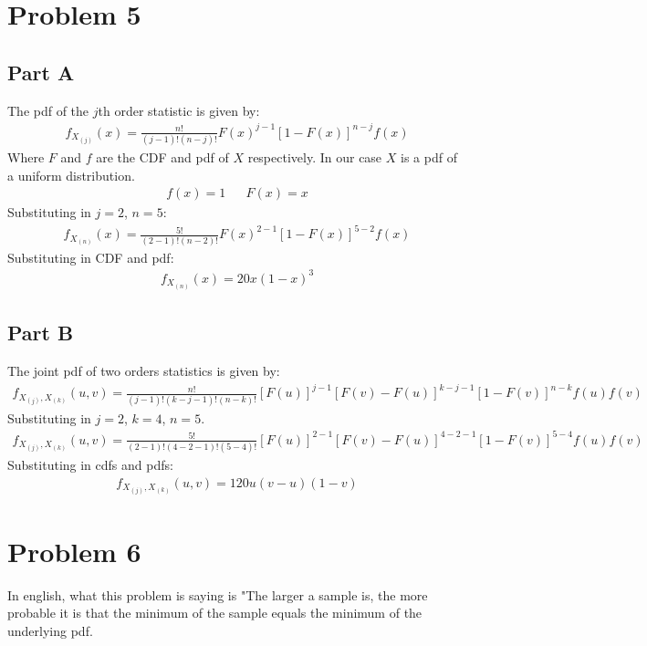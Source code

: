 \documentclass{article}
\begin{document}
\clearpage
\section*{Problem 5}
\subsection*{Part A}
The pdf of the $j$th order statistic is given by:
\begin{align*}
f_{X_{(j)}}(x) = \frac{n!}{(j-1)! (n-j)!} F(x)^{j-1} [1-F(x)]^{n-j} f(x)
\end{align*}
Where $F$ and $f$ are the CDF and pdf of $X$ respectively. In our case $X$ is a pdf of a uniform distribution.
\begin{align*}
f(x) = 1 && F(x) = x
\end{align*}
Substituting in $j=2$, $n=5$:
\begin{align*}
f_{X_{(n)}}(x) = \frac{5!}{(2-1)! (n-2)!} F(x)^{2-1} [1-F(x)]^{5-2} f(x)
\end{align*}
Substituting in CDF and pdf:
\begin{align*}
\boxed{ f_{X_{(n)}}(x) = 20 x (1-x)^{3} }
\end{align*}
\subsection*{Part B}
The joint pdf of two orders statistics is given by:
\begin{align*}
f_{X_{(j)},X_{(k)}}(u,v) = \frac{n!}{(j-1)! (k-j-1)! (n-k)!} [F(u)]^{j-1} [F(v)-F(u)]^{k-j-1} [1-F(v)]^{n-k} f(u)f(v)
\end{align*}
Substituting in $j=2$, $k=4$, $n=5$.
\begin{align*}
f_{X_{(j)},X_{(k)}}(u,v) = \frac{5!}{(2-1)! (4-2-1)! (5-4)!} [F(u)]^{2-1} [F(v)-F(u)]^{4-2-1} [1-F(v)]^{5-4} f(u)f(v)
\end{align*}
Substituting in cdfs and pdfs:
\begin{align*}
\boxed{ f_{X_{(j)},X_{(k)}}(u,v) = 120u(v-u)(1-v) }
\end{align*}

\clearpage
\section*{Problem 6}
In english, what this problem is saying is "The larger a sample is, the more probable it is that the minimum of the sample equals the minimum of the underlying pdf.
\end{document}
